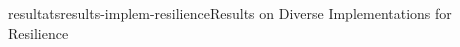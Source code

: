 \documentclass{ra2018}
\begin{document}
\begin{module}{resultats}{results-implem-resilience}{Results on Diverse
		Implementations for Resilience}
	\label{sec:results-implem}
	
\end{module}




\end{document}
